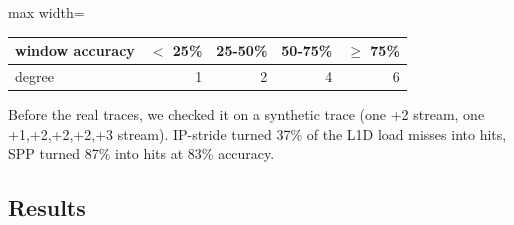 \documentclass[10pt]{article}
\begin{document}
\begin{center}
\begin{adjustbox}{max width=\linewidth}
\begin{tabular}{@{}lrrrr@{}}
\toprule
\textbf{window accuracy} & \textbf{$<$ 25\%} & \textbf{25-50\%} & \textbf{50-75\%} & \textbf{$\geq$ 75\%} \\
\midrule
degree & 1 & 2 & 4 & 6 \\
\bottomrule
\end{tabular}
\end{adjustbox}
\end{center}

Before the real traces, we checked it on a synthetic trace (one +2 stream, one +1,+2,+2,+2,+3 stream). IP-stride turned 37\% of the L1D load misses into hits, SPP turned 87\% into hits at 83\% accuracy.


\subsection{Results}
\end{document}
